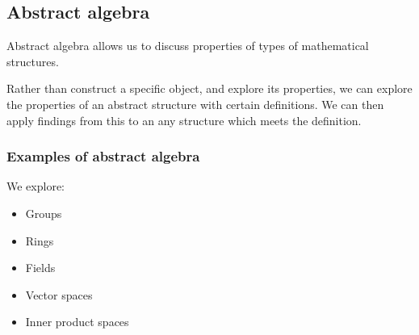 
\subsection{Abstract algebra}

Abstract algebra allows us to discuss properties of types of mathematical structures.

Rather than construct a specific object, and explore its properties, we can explore the properties of an abstract structure with certain definitions. We can then apply findings from this to an any structure which meets the definition.

\subsubsection{Examples of abstract algebra}

We explore:

\begin{itemize}
\item Groups
\item Rings
\item Fields
\item Vector spaces
\item Inner product spaces
\end{itemize}

